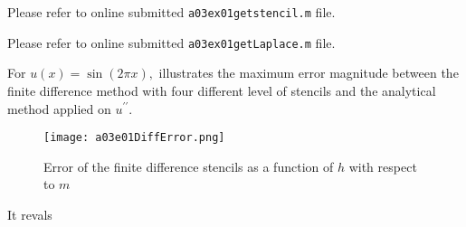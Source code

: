 %
 Please refer to online submitted \texttt{a03ex01getstencil.m} file.

%
 Please refer to online submitted \texttt{a03ex01getLaplace.m} file.

%
For $u(x) = \sin{(2\pi x)}, $\text{ } illustrates the maximum error magnitude between the finite difference method with four different level of stencils and the analytical method applied on $u^{\prime\prime}$.
\begin{figure}[H]
\vspace*{\FigUpperVSpace}
	\texttt{[image: a03e01DiffError.png]} 
	\caption{Error of the finite difference stencils as a function of $h$ with respect to $m$}
	\label{fig:a03e01DiffError}
\end{figure}
It revals